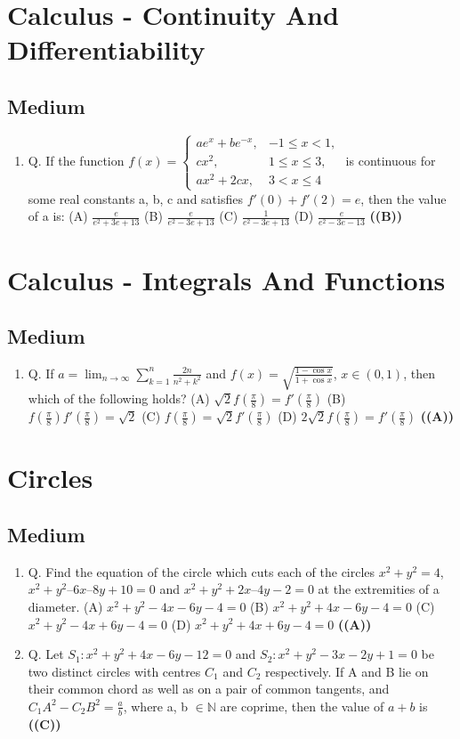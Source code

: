 \documentclass{article}
\begin{document}
\section{Calculus - Continuity And Differentiability}
\subsection{Medium}
\begin{enumerate}
\item Q. If the function
$f(x) = \begin{cases} ae^x + be^{-x}, & -1 \le x < 1, \\ cx^2, & 1 \le x \le 3, \\ ax^2 + 2cx, & 3 < x \le 4 \end{cases}$
is continuous for some real constants a, b, c and satisfies $f'(0) + f'(2) = e$, then the value of a is:
(A) $\frac{e}{e^2 + 3e + 13}$
(B) $\frac{e}{e^2 - 3e + 13}$
(C) $\frac{1}{e^2 - 3e + 13}$
(D) $\frac{e}{e^2 - 3e - 13}$ \hfill \textbf{((B))}
\end{enumerate}
\section{Calculus - Integrals And Functions}
\subsection{Medium}
\begin{enumerate}
\item Q. If $a = \lim_{n \to \infty} \sum_{k=1}^n \frac{2n}{n^2 + k^2}$ and $f(x) = \sqrt{\frac{1 - \cos x}{1 + \cos x}}$, $x \in (0,1)$, then which of the following holds?
(A) $\sqrt{2} f(\frac{\pi}{8}) = f'(\frac{\pi}{8})$
(B) $f(\frac{\pi}{8}) f'(\frac{\pi}{8}) = \sqrt{2}$
(C) $f(\frac{\pi}{8}) = \sqrt{2} f'(\frac{\pi}{8})$
(D) $2\sqrt{2} f(\frac{\pi}{8}) = f'(\frac{\pi}{8})$ \hfill \textbf{((A))}
\end{enumerate}
\section{Circles}
\subsection{Medium}
\begin{enumerate}
\item Q. Find the equation of the circle which cuts each of the circles $x^2 + y^2 = 4$, $x^2 + y^2 – 6x – 8y + 10 = 0$ and $x^2 + y^2 + 2x – 4y − 2 = 0$ at the extremities of a diameter.
(A) $x^2 + y^2 - 4x - 6y - 4 = 0$
(B) $x^2 + y^2 + 4x - 6y - 4 = 0$
(C) $x^2 + y^2 - 4x + 6y − 4 = 0$
(D) $x^2 + y^2 + 4x + 6y − 4 = 0$ \hfill \textbf{((A))}
\item Q. Let $S_1 : x^2 + y^2 + 4x - 6y - 12 = 0$ and $S_2 : x^2 + y^2 - 3x - 2y + 1 = 0$ be two distinct circles with centres $C_1$ and $C_2$ respectively. If A and B lie on their common chord as well as on a pair of common tangents, and $C_1A^2 - C_2B^2 = \frac{a}{b}$, where a, b $\in \mathbb{N}$ are coprime, then the value of $a+b$ is \hfill \textbf{((C))}
\end{enumerate}
\end{document}
